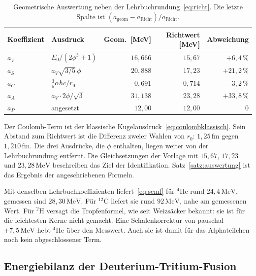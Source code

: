 \documentclass[11pt,a4paper]{article}
\theoremstyle{definition}
\theoremstyle{remark}
\newcommand{\phig}{\phi}
\begin{document}
\begin{table}[ht]
\centering
\caption{Geometrische Auswertung neben der Lehrbuchrundung~\eqref{eq:richt}. Die letzte Spalte ist \((a_{\mathrm{geom}}-a_{\mathrm{Richt}})/a_{\mathrm{Richt}}\).}
\label{tab:koeff}
\medskip
\begin{tabular}{@{}llrrr@{}}
\toprule
Koeffizient & Ausdruck & Geom.\ [MeV] & Richtwert [MeV] & Abweichung \\
\midrule
\(a_V\) & \(E_0/(2\phig^3+1)\) & \(16{,}666\) & \(15{,}67\) & \(+6{,}4\,\%\) \\
\(a_S\) & \(a_V\sqrt{3/5}\,\phig\) & \(20{,}888\) & \(17{,}23\) & \(+21{,}2\,\%\) \\
\(a_C\) & \(\tfrac{3}{5}\alpha\hbar c/r_0\) & \(0{,}691\) & \(0{,}714\) & \(-3{,}2\,\%\) \\
\(a_A\) & \(a_V\cdot 2\phig/\sqrt{3}\) & \(31{,}138\) & \(23{,}28\) & \(+33{,}8\,\%\) \\
\(a_P\) & angesetzt & \(12{,}00\) & \(12{,}00\) & \(0\) \\
\bottomrule
\end{tabular}
\end{table}

Der Coulomb-Term ist der klassische Kugelausdruck~\eqref{eq:coulombklassisch}. Sein Abstand zum Richtwert ist die Differenz zweier Wahlen von \(r_0\): \(1{,}25\,\mathrm{fm}\) gegen \(1{,}210\,\mathrm{fm}\). Die drei Ausdrücke, die \(\phig\) enthalten, liegen weiter von der Lehrbuchrundung entfernt. Die Gleichsetzungen der Vorlage mit \(15{,}67\), \(17{,}23\) und \(23{,}28\,\mathrm{MeV}\) beschreiben das Ziel der Identifikation. Satz~\ref{satz:auswertung} ist das Ergebnis der angeschriebenen Formeln.

Mit denselben Lehrbuchkoeffizienten liefert~\eqref{eq:semf} für \(^{4}\mathrm{He}\) rund \(24{,}4\,\mathrm{MeV}\), gemessen sind \(28{,}30\,\mathrm{MeV}\). Für \(^{12}\mathrm{C}\) liefert sie rund \(92\,\mathrm{MeV}\), nahe am gemessenen Wert. Für \(^{2}\mathrm{H}\) versagt die Tropfenformel, wie seit Weizsäcker bekannt: sie ist für die leichtesten Kerne nicht gemacht. Eine Schalenkorrektur von pauschal \(+7{,}5\,\mathrm{MeV}\) hebt \(^{4}\mathrm{He}\) über den Messwert. Auch sie ist damit für das Alphateilchen noch kein abgeschlossener Term.

\subsection{Energiebilanz der Deuterium-Tritium-Fusion}
\label{sec:dt}
\end{document}
